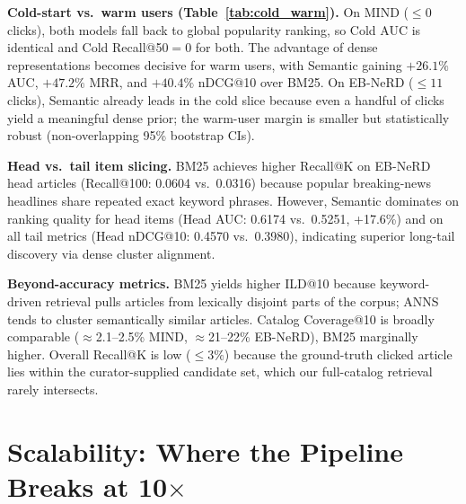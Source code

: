 \documentclass[11pt,a4paper]{article}
\begin{document}
\textbf{Cold-start vs.\ warm users (Table~\ref{tab:cold_warm}).}
On MIND ($\leq 0$ clicks), both models fall back to global popularity ranking, so Cold AUC is identical and Cold Recall@50$=0$ for both.
The advantage of dense representations becomes decisive for warm users, with Semantic gaining $+26.1\%$ AUC, $+47.2\%$ MRR, and $+40.4\%$ nDCG@10 over BM25.
On EB-NeRD ($\leq 11$ clicks), Semantic already leads in the cold slice because even a handful of clicks yield a meaningful dense prior; the warm-user margin is smaller but statistically robust (non-overlapping 95\% bootstrap CIs).

\textbf{Head vs.\ tail item slicing.}
BM25 achieves higher Recall@K on EB-NeRD head articles (Recall@100: 0.0604 vs.\ 0.0316) because popular breaking-news headlines share repeated exact keyword phrases.  However, Semantic dominates on ranking quality for head items (Head AUC: 0.6174 vs.\ 0.5251, +17.6\%) and on all tail metrics (Head nDCG@10: 0.4570 vs.\ 0.3980), indicating superior long-tail discovery via dense cluster alignment.

\textbf{Beyond-accuracy metrics.}
BM25 yields higher ILD@10 because keyword-driven retrieval pulls articles from lexically disjoint parts of the corpus; ANNS tends to cluster semantically similar articles.  Catalog Coverage@10 is broadly comparable ($\approx$2.1--2.5\% MIND, $\approx$21--22\% EB-NeRD), BM25 marginally higher.  Overall Recall@K is low ($\leq 3\%$) because the ground-truth clicked article lies within the curator-supplied candidate set, which our full-catalog retrieval rarely intersects.

\section{Scalability: Where the Pipeline Breaks at 10$\times$}
\end{document}
